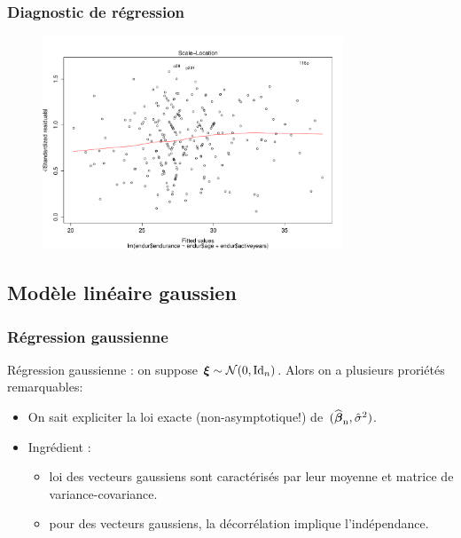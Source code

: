 \begin{frame}
\frametitle{Diagnostic de régression}
\begin{figure}
  \centering
  \includegraphics[width=0.8\textwidth]{Standardized-Residuals}\\
\end{figure}
\end{frame}











\subsection{Modèle linéaire gaussien}

\begin{frame}
\frametitle{Régression gaussienne} \alert{Régression gaussienne} : on
suppose $\boldsymbol{\xi} \sim {\mathcal N}(0,\mathrm{Id}_{n})$. Alors on a plusieurs proriétés
remarquables:
\begin{itemize}
\item  On sait expliciter la loi \alert{ exacte} (non-asymptotique!)
de~$(\operatorname{\widehat{\boldsymbol{\beta}}_n},\hat{\sigma}^2)$.\\\vspace{1mm}
\item \alert{Ingrédient} :
\begin{itemize}
\item loi des vecteurs gaussiens sont caractérisés par leur moyenne et matrice de
variance-covariance.
\item pour des vecteurs gaussiens, la décorrélation implique l'indépendance.
\end{itemize}
\end{itemize}
\end{frame}

